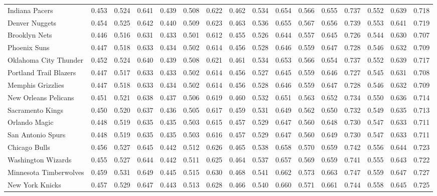 \documentclass[11pt,a4paper]{article}
\begin{document}
\begin{table}[H]
\begin{tabular}{l ccc ccc ccc ccc ccc}
Indiana Pacers & 0.453 & 0.524 & 0.641 & 0.439 & 0.508 & 0.622 & 0.462 & 0.534 & 0.654 & 0.566 & 0.655 & 0.737 & 0.552 & 0.639 & 0.718 \\
Denver Nuggets & 0.454 & 0.525 & 0.642 & 0.440 & 0.509 & 0.623 & 0.463 & 0.536 & 0.655 & 0.567 & 0.656 & 0.739 & 0.553 & 0.641 & 0.719 \\
Brooklyn Nets & 0.446 & 0.516 & 0.631 & 0.433 & 0.501 & 0.612 & 0.455 & 0.526 & 0.644 & 0.557 & 0.645 & 0.726 & 0.544 & 0.630 & 0.707 \\
Phoenix Suns & 0.447 & 0.518 & 0.633 & 0.434 & 0.502 & 0.614 & 0.456 & 0.528 & 0.646 & 0.559 & 0.647 & 0.728 & 0.546 & 0.632 & 0.709 \\
Oklahoma City Thunder & 0.452 & 0.524 & 0.640 & 0.439 & 0.508 & 0.621 & 0.461 & 0.534 & 0.653 & 0.566 & 0.654 & 0.737 & 0.552 & 0.639 & 0.717 \\
Portland Trail Blazers & 0.447 & 0.517 & 0.633 & 0.433 & 0.502 & 0.614 & 0.456 & 0.527 & 0.645 & 0.559 & 0.646 & 0.727 & 0.545 & 0.631 & 0.708 \\
Memphis Grizzlies & 0.447 & 0.518 & 0.633 & 0.434 & 0.502 & 0.614 & 0.456 & 0.528 & 0.646 & 0.559 & 0.647 & 0.728 & 0.546 & 0.632 & 0.709 \\
New Orleans Pelicans & 0.451 & 0.521 & 0.638 & 0.437 & 0.506 & 0.619 & 0.460 & 0.532 & 0.651 & 0.563 & 0.652 & 0.734 & 0.550 & 0.636 & 0.714 \\
Sacramento Kings & 0.450 & 0.520 & 0.637 & 0.436 & 0.505 & 0.617 & 0.459 & 0.531 & 0.649 & 0.562 & 0.650 & 0.732 & 0.549 & 0.635 & 0.713 \\
Orlando Magic & 0.448 & 0.519 & 0.635 & 0.435 & 0.503 & 0.615 & 0.457 & 0.529 & 0.647 & 0.560 & 0.648 & 0.730 & 0.547 & 0.633 & 0.711 \\
San Antonio Spurs & 0.448 & 0.519 & 0.635 & 0.435 & 0.503 & 0.616 & 0.457 & 0.529 & 0.647 & 0.560 & 0.649 & 0.730 & 0.547 & 0.633 & 0.711 \\
Chicago Bulls & 0.456 & 0.527 & 0.645 & 0.442 & 0.512 & 0.626 & 0.465 & 0.538 & 0.658 & 0.570 & 0.659 & 0.742 & 0.556 & 0.644 & 0.723 \\
Washington Wizards & 0.455 & 0.527 & 0.644 & 0.442 & 0.511 & 0.625 & 0.464 & 0.537 & 0.657 & 0.569 & 0.659 & 0.741 & 0.555 & 0.643 & 0.722 \\
Minnesota Timberwolves & 0.459 & 0.531 & 0.649 & 0.445 & 0.515 & 0.630 & 0.468 & 0.541 & 0.662 & 0.573 & 0.663 & 0.747 & 0.559 & 0.647 & 0.727 \\
New York Knicks & 0.457 & 0.529 & 0.647 & 0.443 & 0.513 & 0.628 & 0.466 & 0.540 & 0.660 & 0.571 & 0.661 & 0.744 & 0.558 & 0.645 & 0.725 \\

\end{tabular}
\end{table}
\end{document}
